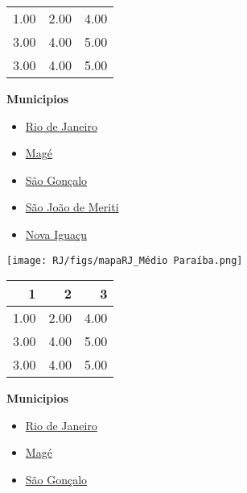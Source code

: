 \documentclass[10pt]{article} %
\begin{document}
\begin{minipage}[t]{.66\linewidth}
\begin{center}
\begin{tabular}{rrr}
  \hline
1.00 & 2.00 & 4.00 \\ 
  3.00 & 4.00 & 5.00 \\ 
  3.00 & 4.00 & 5.00 \\ 
   \hline
\end{tabular}
\end{center}
\end{minipage}\hfill\begin{minipage}[t]{.30\linewidth}
\begin{mdframed}[style=sidebar,frametitle={}]
\textbf{Municipios}\begin{itemize}\item \hyperlink{Rio}{Rio de Janeiro}
\item \hyperlink{Mag}{Magé}
\item \hyperlink{SGoncalo}{São Gonçalo}
\item \hyperlink{SJMeriti}{São João de Meriti}
\item \hyperlink{Niguacu}{Nova Iguaçu}
\end{itemize}\end{mdframed}\hfill\end{minipage}\newpage\begin{minipage}[t]{.66\linewidth}
\hypertarget{MedPar}{}
\texttt{[image: RJ/figs/mapaRJ\_Médio Paraíba.png]}\vspace{0.5cm}\begin{center}
\begin{tabular}{rrr}
  \hline
1 & 2 & 3 \\ 
  \hline
1.00 & 2.00 & 4.00 \\ 
  3.00 & 4.00 & 5.00 \\ 
  3.00 & 4.00 & 5.00 \\ 
   \hline
\end{tabular}
\end{center}
\end{minipage}\hfill\begin{minipage}[t]{.30\linewidth}
\begin{mdframed}[style=sidebar,frametitle={}]
\textbf{Municipios}\begin{itemize}\item \hyperlink{Rio}{Rio de Janeiro}
\item \hyperlink{Mag}{Magé}
\item \hyperlink{SGoncalo}{São Gonçalo}

\end{itemize}
\end{mdframed}
\end{minipage}
\end{document}
